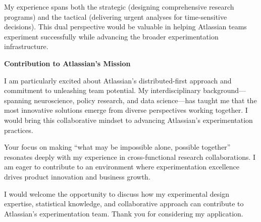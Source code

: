 \documentclass[10.5pt, letterpaper]{russell}
\begin{document}
\begin{cvletter}
  My experience spans both the strategic (designing comprehensive research programs) and the tactical (delivering urgent analyses for time-sensitive decisions). This dual perspective would be valuable in helping Atlassian teams experiment successfully while advancing the broader experimentation infrastructure.

  \textbf{Contribution to Atlassian's Mission}

  I am particularly excited about Atlassian's distributed-first approach and commitment to unleashing team potential. My interdisciplinary background—spanning neuroscience, policy research, and data science—has taught me that the most innovative solutions emerge from diverse perspectives working together. I would bring this collaborative mindset to advancing Atlassian's experimentation practices.

  Your focus on making ``what may be impossible alone, possible together'' resonates deeply with my experience in cross-functional research collaborations. I am eager to contribute to an environment where experimentation excellence drives product innovation and business growth.

  I would welcome the opportunity to discuss how my experimental design expertise, statistical knowledge, and collaborative approach can contribute to Atlassian's experimentation team. Thank you for considering my application.

\end{cvletter}

\makeletterclosing
\end{document}
